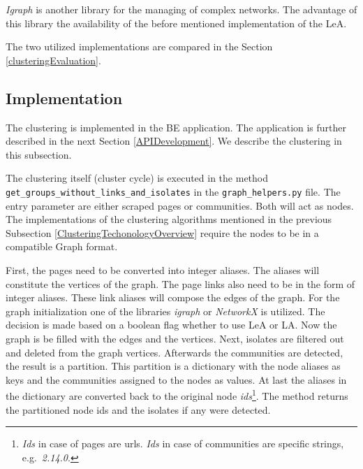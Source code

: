 \textit{Igraph} is another library for the managing of complex networks. The advantage of this library the availability of the before mentioned implementation of the LeA.

The two utilized implementations are compared in the Section \ref{clusteringEvaluation}.

\subsection{Implementation} \label{ClusteringImplementation}
The clustering is implemented in the BE application. The application is further described in the next Section \ref{APIDevelopment}. We describe the clustering in this subsection. 

The clustering itself (cluster cycle) is executed in the method \\ \texttt{get\_groups\_without\_links\_and\_isolates} in the \texttt{graph\_helpers.py} file. The entry parameter are either scraped pages or communities. Both will act as nodes. The implementations of the clustering algorithms mentioned in the previous Subsection \ref{ClusteringTechonologyOverview} require the nodes to be in a compatible Graph format. 

First, the pages need to be converted into integer aliases. The aliases will constitute the vertices of the graph. The page links also need to be in the form of integer aliases. These link aliases will compose the edges of the graph. For the graph initialization one of the libraries \textit{igraph} or \textit{NetworkX} is utilized. The decision is made based on a boolean flag whether to use LeA or LA. Now the graph is be filled with the edges and the vertices. Next, isolates are filtered out and deleted from the graph vertices. Afterwards the communities are detected, the result is a partition. This partition is a dictionary with the node aliases as keys and the communities assigned to the nodes as values. At last the aliases in the dictionary are converted back to the original node \textit{ids}\footnote{\textit{Ids} in case of pages are urls. \textit{Ids} in case of communities are specific strings, e.g.~\textit{2.14.0}.}. The method returns the partitioned node ids and the isolates if any were detected. 

